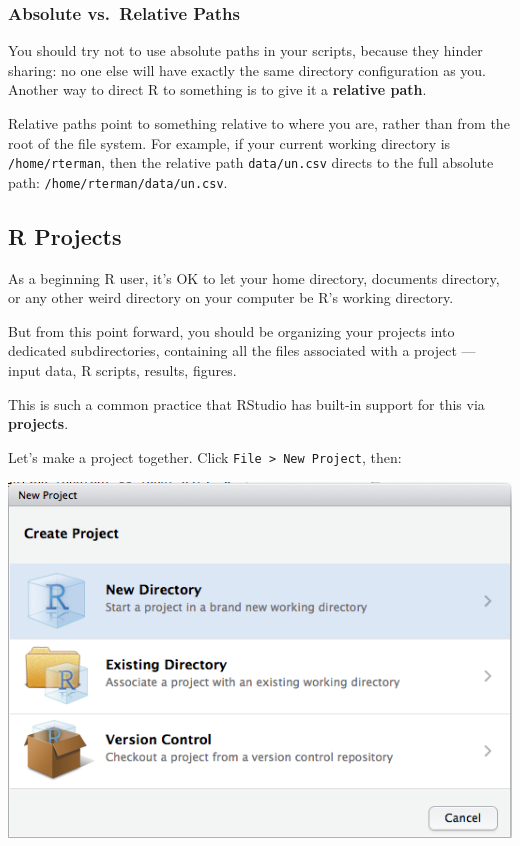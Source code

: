 \documentclass[]{book}
\begin{document}
\hypertarget{absolute-vs.relative-paths}{%
\subsubsection*{Absolute vs.~Relative Paths}\label{absolute-vs.relative-paths}}

You should try not to use absolute paths in your scripts, because they hinder sharing: no one else will have exactly the same directory configuration as you. Another way to direct R to something is to give it a \textbf{relative path}.

Relative paths point to something relative to where you are, rather than from the root of the file system. For example, if your current working directory is \texttt{/home/rterman}, then the relative path \texttt{data/un.csv} directs to the full absolute path: \texttt{/home/rterman/data/un.csv}.

\hypertarget{r-projects}{%
\subsection{R Projects}\label{r-projects}}

As a beginning R user, it's OK to let your home directory, documents directory, or any other weird directory on your computer be R's working directory.

But from this point forward, you should be organizing your projects into dedicated subdirectories, containing all the files associated with a project --- input data, R scripts, results, figures.

This is such a common practice that RStudio has built-in support for this via \textbf{projects}.

Let's make a project together. Click \texttt{File\ \textgreater{}\ New\ Project}, then:

\begin{center}\includegraphics[width=0.7\linewidth]{img/rstudio-project-1} \end{center}
\end{document}
